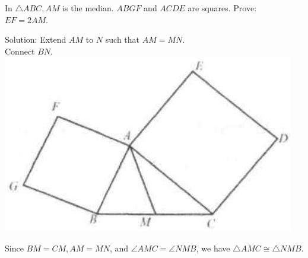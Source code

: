 \documentclass{article}
\begin{document}
In \(\triangle A B C, A M\) is the median. \(A B G F\) and \(A C D E\) are squares. Prove:\\
\(E F=2 A M\).

Solution:
Extend \(A M\) to \(N\) such that \(A M=M N\).\\
Connect \(B N\).\\
\centering
\includegraphics[width=\textwidth]{images/025(2).jpg}

Since \(B M=C M, A M=M N\), and \(\angle A M C=\angle N M B\), we have \(\triangle A M C \cong \triangle N M B\).
\end{document}
